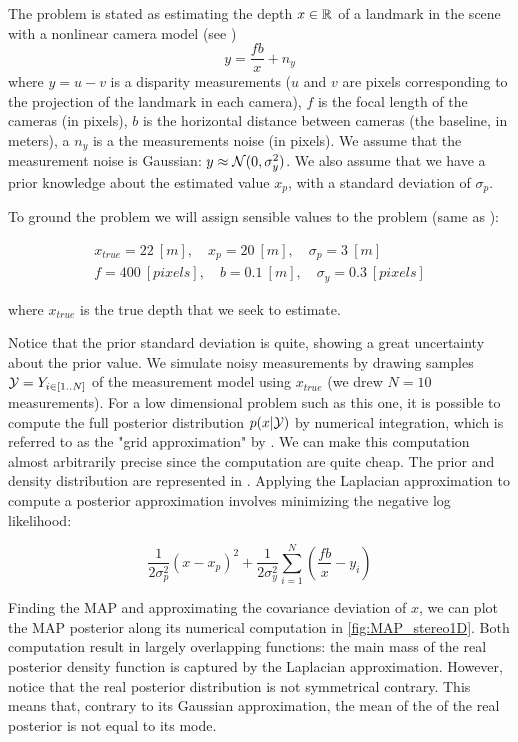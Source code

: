 %
The problem is stated as estimating the depth $x \in \mathbb{R}$ of a landmark in the scene with a nonlinear camera model (see )
%
\begin{equation}
    y = \frac{fb}{x} + n_y
\end{equation}
%
where $y=u - v$ is a disparity measurements ($u$ and $v$ are pixels corresponding to the projection of the landmark in each camera), $f$ is the focal
length of the cameras (in pixels), $b$ is the horizontal distance between cameras (the baseline, in meters), a $n_y$ is a the measurements noise (in pixels).
We assume that the measurement noise is Gaussian: $y \approx \mathcal{N}({0},{\sigma_y^2})$. We also assume that we have a prior knowledge about the 
estimated value $x_p$, with a standard deviation of $\sigma_p$.

To ground the problem we will assign sensible values to the problem (same as \cite{barfoot2017state}):

\begin{gather*}
    x_{true} = 22~[m], \quad x_p = 20~[m], \quad \sigma_p = 3~[m] \\
    f = 400~[pixels], \quad b = 0.1~[m], \quad \sigma_y = 0.3~[pixels]   
\end{gather*}

where $x_{true}$ is the true depth that we seek to estimate.

Notice that the prior standard deviation is quite, showing a great uncertainty about the prior value. We simulate noisy measurements by drawing samples 
$\mathcal{Y} = {Y}_{i \in [1..N]}$ of the measurement model using $x_{true}$ (we drew $N=10$ measurements). For a low dimensional problem such as this one, 
it is possible to compute the full posterior distribution $p(x|\mathcal{Y})$ by numerical integration, which is referred to as the "grid approximation" by 
\cite{mcelreath2018statistical}. We can make this computation almost arbitrarily precise since the computation are quite cheap. The prior and density distribution are represented in . Applying the Laplacian approximation to
compute a posterior approximation involves minimizing the negative log likelihood:

\begin{equation}
    \frac{1}{2 \sigma_p^2}(x - x_p)^2 + \frac{1}{2\sigma_y^2} \sum_{i=1}^N (\frac{fb}{x} - y_i)
\end{equation}

Finding the MAP and approximating the covariance deviation of $x$, we can plot the MAP posterior along its numerical computation in \ref{fig:MAP_stereo1D}. 
Both computation result in largely overlapping functions: the main mass of the real posterior density function is captured by the Laplacian approximation.
However, notice that the real posterior distribution is not symmetrical contrary. This means that, contrary to its Gaussian approximation, the mean of the
of the real posterior is not equal to its mode. 


